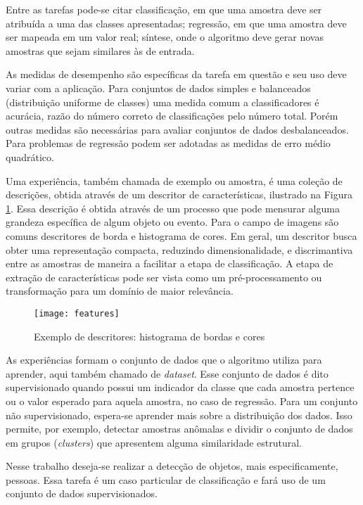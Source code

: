 Entre as tarefas pode-se citar classificação, em que uma amostra deve ser atribuída a uma das classes apresentadas; regressão, em que uma amostra deve ser mapeada em um valor real; síntese, onde o algoritmo deve gerar novas amostras que sejam similares às de entrada.

As medidas de desempenho são específicas da tarefa em questão e seu uso deve variar com a aplicação. Para conjuntos de dados simples e balanceados (distribuição uniforme de classes) uma medida comum a classificadores é acurácia, razão do número correto de classificações pelo número total. Porém outras medidas são necessárias para avaliar conjuntos de dados desbalanceados. Para problemas de regressão podem ser adotadas as medidas de erro médio quadrático.

Uma experiência, também chamada de exemplo ou amostra, é uma coleção de descrições, obtida através de um descritor de características, ilustrado na Figura \ref{fig:features}. Essa descrição é obtida através de um processo que pode mensurar alguma grandeza específica de algum objeto ou evento. Para o campo de imagens são comuns descritores de borda e histograma de cores. Em geral, um descritor busca obter uma representação compacta, reduzindo dimensionalidade, e discrimantiva entre as amostras de maneira a facilitar a etapa de classificação. A etapa de extração de características pode ser vista como um pré-processamento ou transformação para um domínio de maior relevância.

\begin{figure}[h]
\centering
\texttt{[image: features]}
\caption{Exemplo de descritores: histograma de bordas e cores}
\label{fig:features}
\end{figure}

As experiências formam o conjunto de dados que o algoritmo utiliza para aprender, aqui também chamado de \textit{dataset}. Esse conjunto de dados é dito supervisionado quando possui um indicador da classe que cada amostra pertence ou o valor esperado para aquela amostra, no caso de regressão. Para um conjunto não supervisionado, espera-se aprender mais sobre a distribuição dos dados. Isso permite, por exemplo, detectar amostras anômalas e dividir o conjunto de dados em grupos (\textit{clusters}) que apresentem alguma similaridade estrutural.

Nesse trabalho deseja-se realizar a detecção de objetos, mais especificamente, pessoas. Essa tarefa é um caso particular de classificação e fará uso de um conjunto de dados supervisionados.


